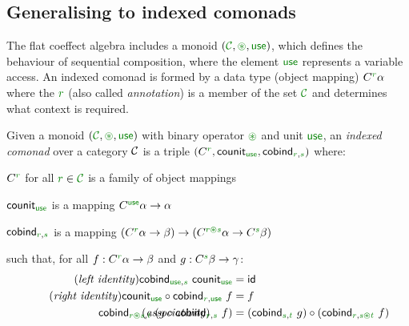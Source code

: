 
\subsection{Generalising to indexed comonads}
\label{sec:semantics-flat-idx}

The flat coeffect algebra includes a monoid $(\C, \cseq, \cunit)$, which defines the behaviour of
sequential composition, where the element $\cunit$ represents a variable access. An indexed
comonad is formed by a data type (object mapping) $\ctyp{\cclrd{r}}{\alpha}$ where the $\cclrd{r}$
(also called \emph{annotation}) is a member of the set $\C$ and determines what context is required.

\begin{definition}
Given a monoid $(\C, \cseq, \cunit)$ with binary operator $\cseq$ and unit $\cunit$, an
\emph{indexed comonad} over a category $\mathcal{C}$ is a triple
$(\ctyp{\cclrd{r}{}}, \ident{counit}_{\cunit}, \ident{cobind}_{\cclrd{r}, \cclrd{s}})$ where:

\begin{compactitem}
\item $\ctyp{\cclrd{r}}{}$ for all $\cclrd{r} \in \C$ is a family of object mappings
\item $\ident{counit}_{\cunit}$ is a mapping $\ctyp{\cunit}{\alpha} \rightarrow \alpha$
\item $\ident{cobind}_{\cclrd{r}, \cclrd{s}}$ is a mapping $(\ctyp{\cclrd{r}}{\alpha} \rightarrow \beta)
  \rightarrow (\ctyp{\cclrd{r}\cseq\cclrd{s}}{\alpha} \rightarrow \ctyp{\cclrd{s}}{\beta})$
\end{compactitem}
such that, for all $f:\ctyp{\cclrd{r}}{\alpha} \rightarrow \beta$ and $g:\ctyp{\cclrd{s}}{\beta} \rightarrow \gamma$:
\begin{align}
\tag{\emph{left identity}}
  \ident{cobind}_{\cunit, \cclrd{s}}~\ident{counit}_{\cunit} &= \idf{}
  \\
\tag{\emph{right identity}}
  \ident{counit}_{\cunit} \circ \ident{cobind}_{\cclrd{r}, \cunit}~f &= f
  \\
\tag{\emph{associativity}}
\hspace{-10em}
  \ident{cobind}_{\cclrd{r}\cseq\cclrd{s},\cclrd{t}}~(g \circ \ident{cobind}_{\cclrd{r}, \cclrd{s}}~f) &=
    (\ident{cobind}_{\cclrd{s}, \cclrd{t}}~g) \circ (\ident{cobind}_{\cclrd{r}, \cclrd{s}\cseq\cclrd{t}}~f)
\end{align}
\end{definition}


